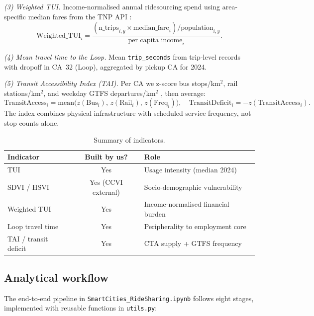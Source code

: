 \documentclass[10pt, a4paper]{article}
\begin{document}
\textit{(3) Weighted TUI.}
Income-normalised annual ridesourcing spend using area-specific median fares from the TNP API \cite{chicago_tnp}:
\begin{equation}
    \mathrm{Weighted\_TUI}_i = \frac{(\text{n\_trips}_{i,y} \times \text{median\_fare}_i) / \text{population}_{i,y}}{\text{per capita income}_i}.
\end{equation}

\textit{(4) Mean travel time to the Loop.}
Mean \texttt{trip\_seconds} from trip-level records with dropoff in CA~32 (Loop), aggregated by pickup CA for 2024.

\textit{(5) Transit Accessibility Index (TAI).}
Per CA we z-score bus stops/km$^2$, rail stations/km$^2$, and weekday GTFS departures/km$^2$ \cite{cta_bus_stops,cta_rail_stations,gtfs_cta}, then average:
\begin{equation}
    \mathrm{TransitAccess}_i = \mathrm{mean}\bigl(z(\mathrm{Bus}_i),\, z(\mathrm{Rail}_i),\, z(\mathrm{Freq}_i)\bigr), \quad
    \mathrm{TransitDeficit}_i = -z(\mathrm{TransitAccess}_i).
\end{equation}
The index combines physical infrastructure with scheduled service frequency, not stop counts alone.

\begin{table}[htbp]
    \centering
    \caption{Summary of indicators.}
    \label{tab:indicators}
    \small
    \begin{tabular}{|l|c|p{5.5cm}|}
        \hline
        \textbf{Indicator} & \textbf{Built by us?} & \textbf{Role} \\
        \hline
        TUI & Yes & Usage intensity (median 2024) \\
        SDVI / HSVI & Yes (CCVI external) & Socio-demographic vulnerability \\
        Weighted TUI & Yes & Income-normalised financial burden \\
        Loop travel time & Yes & Peripherality to employment core \\
        TAI / transit deficit & Yes & CTA supply + GTFS frequency \\
        \hline
    \end{tabular}
\end{table}

\subsection{Analytical workflow}
The end-to-end pipeline in \texttt{SmartCities\_RideSharing.ipynb} follows eight stages, implemented with reusable functions in \texttt{utils.py}:
\end{document}
